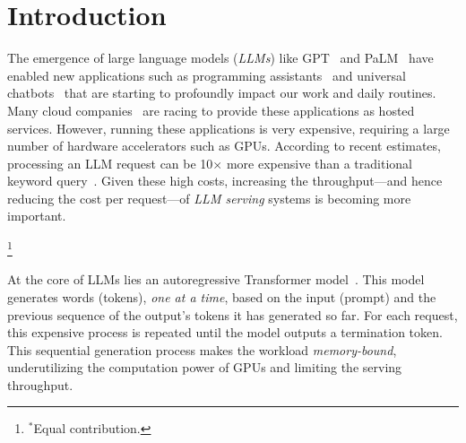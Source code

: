 \section{Introduction}
\label{sec:intro}

The emergence of large language models (\emph{LLMs}) like GPT~\cite{openai2023gpt4,brown2020language} and PaLM~\cite{chowdhery2022palm} have enabled new applications such as programming assistants~\cite{copilot, chen2021evaluating} and universal chatbots~\cite{chatgpt, bard} that are starting to profoundly impact our work and daily routines. Many cloud companies~\cite{openaiapi, amazonbedrock} are racing to provide these applications as hosted services. However, running these applications is very expensive, requiring a large number of hardware accelerators such as GPUs. According to recent estimates, processing an LLM request can be 10$\times$ more expensive than a traditional keyword query~\cite{chat-cost}.
Given these high costs, increasing the throughput---and hence reducing the cost per request---of \emph{LLM serving} systems is becoming more important.

{\let\thefootnote\relax\footnote{{$^*$Equal contribution.}}\addtocounter{footnote}{-1}} At the core of LLMs lies an autoregressive Transformer model~\cite{vaswani2017attention}. 
This model generates words (tokens), \emph{one at a time}, based on the input (prompt) and the previous sequence of the output's tokens it has generated so far.
For each request, this expensive process is repeated until the model outputs a termination token.
This sequential generation process makes the workload \emph{memory-bound}, underutilizing the computation power of GPUs and limiting the serving throughput.


